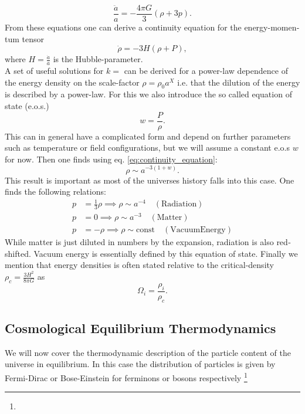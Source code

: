 \documentclass[master,       %
               twoside,        %
               BCOR10mm,       %
               english,ngerman, %
               ]{GAUBM}
\begin{document}
\begin{otherlanguage}{english}
{}
\begin{equation}
	\frac{\ddot{a}}{a} = - \frac{4 \pi G}{3} ( \rho + 3 p ).
\end{equation}
From these equations one can derive a continuity equation for the energy-momentum tensor
\begin{equation}
	\label{eq:continuity_equation}
	\dot{\rho} = - 3 H (\rho + P),
\end{equation}
where $H = \frac{\dot{a}}{a}$ is the Hubble-parameter. \\
\noindent A set of useful solutions for $k = $ can be derived for a power-law dependence of the energy density on the scale-factor $\rho = \rho_0 a^X$ i.e. that the dilution of the energy is described by a power-law. For this we also introduce the so called equation of state (e.o.s.)
\begin{equation}
	w = \frac{P}{\rho}.
\end{equation}
This can in general have a complicated form and depend on further parameters such as temperature or field configurations, but we will assume a constant e.o.s $w$ for now.
Then one finds using eq. \eqref{eq:continuity_equation}:
\begin{equation}
	\rho \sim a^{-3(1 + w)}.
\end{equation}
This result is important as most of the universes history falls into this case.
One finds the following relations:
\begin{align}
	p &= \frac{1}{3} \rho \implies \rho \sim a^{-4} \quad \mathrm{(Radiation)} \nonumber \\
	p &= 0 \implies \rho \sim a^{-3} \quad \mathrm{(Matter)} \nonumber \\
	p &= - \rho \implies \rho \sim \mathrm{const} \quad \mathrm{(Vacuum Energy)}
\end{align}
While matter is just diluted in numbers by the expansion, radiation is also redshifted.
Vacuum energy is essentially defined by this equation of state.
Finally we mention that energy densities is often stated relative to the critical-density $\rho_c = \frac{3 H^2}{8 \pi G}$ as
\begin{equation}
	\Omega_i = \frac{\rho_i}{\rho_c}.
\end{equation}

\subsection{Cosmological Equilibrium Thermodynamics}
We will now cover the thermodynamic description of the particle content of the universe
in equilibrium.
In this case the distribution of particles is given by Fermi-Dirac or Bose-Einstein for ferminons or bosons respectively \footnote{

}
\end{otherlanguage}
\end{document}
